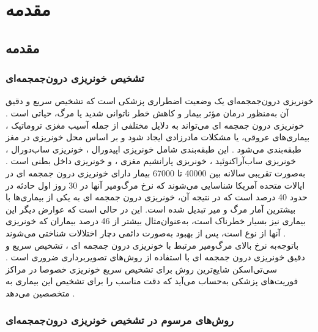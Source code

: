 \chapter{مقدمه}

\section{مقدمه}
\subsection{تشخیص خونریزی درون‌جمجمه‌ای}

خونریزی‌ درون‌جمجمه‌ای
یک وضعیت اضطراری پزشکی است که تشخیص سریع و دقیق آن به‌منظور درمان مؤثر بیمار و کاهش خطر ناتوانی شدید یا مرگ، حیاتی است \cite{grewal2018radnet}.
خونریزی درون جمجمه ای
می‌تواند به دلایل مختلفی از جمله آسیب مغزی تروماتیک
، بیماری‌های عروقی، یا مشکلات مادرزادی ایجاد شود و بر اساس محل خونریزی در مغز طبقه‌بندی می‌شود \cite{monica2022detection}.
این طبقه‌بندی شامل خونریزی اپیدورال
 ، خونریزی ساب‌دورال
  ، خونریزی ساب‌آراکنوئید
   ، خونریزی پارانشیم مغزی 
   ، و خونریزی داخل بطنی
  است \cite{burduja2020accurate,hssayeni2020intracranial}. 
 به‌صورت تقریبی سالانه بین 40000 تا 67000 بیمار دارای
خونریزی درون جمجمه ای
   در ایالات متحده آمریکا شناسایی می‌شوند که نرخ مرگ‌ومیر آنها در 30 روز اول حادثه در حدود 40 درصد است که در نتیجه آن، 
خونریزی درون جمجمه ای
   به یکی از بیماری‌ها با بیشترین آمار مرگ و میر تبدیل شده است. این در حالی است که عوارض دیگر این بیماری نیز بسیار خطرناک است، به‌عنوان‌مثال بیشتر از 46 درصد بیماران که خونریزی آنها از نوع 
 است، پس از بهبود به‌صورت دائمی دچار اختلالات شناختی می‌شوند
  ‎\cite{arbabshirani2018advanced,burduja2020accurate,morgenstern2010guidelines,van2010incidence,hackett2000health}‎.
  باتوجه‌به نرخ بالای مرگ‌ومیر مرتبط با 
  خونریزی درون جمجمه ای
  ، تشخیص سریع و دقیق 
  خونریزی درون جمجمه ای
  با استفاده از روش‌های تصویربرداری ضروری است \cite{kuo2019expert}. سی‌تی‌اسکن
   شایع‌ترین روش برای تشخیص سریع خونریزی خصوصا در مراکز فوریت‌های پزشکی به‌حساب می‌آید که دقت مناسب را برای تشخیص این بیماری به متخصصین می‌دهد \cite{ye2019precise,grewal2018radnet,arbabshirani2018advanced,chilamkurthy2018deep}.


\subsection{روش‌های مرسوم در تشخیص خونریزی درون‌جمجمه‌ای}

